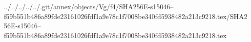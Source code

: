 ../../../../../.git/annex/objects/Vg/f4/SHA256E-s15046--f59b551b486a89fde23161026fdf1a9e78c1f7008be340fd5938482a213c9218.tex/SHA256E-s15046--f59b551b486a89fde23161026fdf1a9e78c1f7008be340fd5938482a213c9218.tex